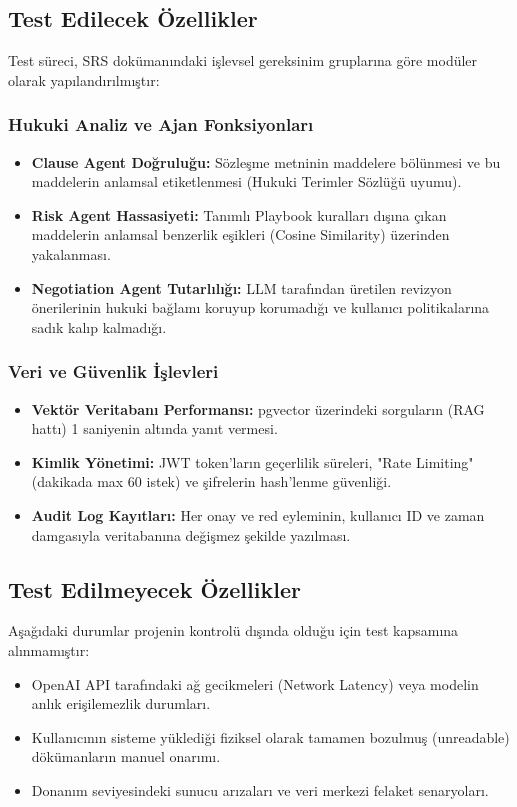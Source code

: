 \documentclass[12pt,a4paper]{article}
\begin{document}
\subsection{Test Edilecek Özellikler}
Test süreci, SRS dokümanındaki işlevsel gereksinim gruplarına göre modüler olarak yapılandırılmıştır:

\subsubsection{Hukuki Analiz ve Ajan Fonksiyonları}
\begin{itemize}
    \item \textbf{Clause Agent Doğruluğu:} Sözleşme metninin maddelere bölünmesi ve bu maddelerin anlamsal etiketlenmesi (Hukuki Terimler Sözlüğü uyumu).
    \item \textbf{Risk Agent Hassasiyeti:} Tanımlı Playbook kuralları dışına çıkan maddelerin anlamsal benzerlik eşikleri (Cosine Similarity) üzerinden yakalanması.
    \item \textbf{Negotiation Agent Tutarlılığı:} LLM tarafından üretilen revizyon önerilerinin hukuki bağlamı koruyup korumadığı ve kullanıcı politikalarına sadık kalıp kalmadığı.
\end{itemize}

\subsubsection{Veri ve Güvenlik İşlevleri}
\begin{itemize}
    \item \textbf{Vektör Veritabanı Performansı:} pgvector üzerindeki sorguların (RAG hattı) 1 saniyenin altında yanıt vermesi.
    \item \textbf{Kimlik Yönetimi:} JWT token'ların geçerlilik süreleri, "Rate Limiting" (dakikada max 60 istek) ve şifrelerin hash'lenme güvenliği.
    \item \textbf{Audit Log Kayıtları:} Her onay ve red eyleminin, kullanıcı ID ve zaman damgasıyla veritabanına değişmez şekilde yazılması.
\end{itemize}

\subsection{Test Edilmeyecek Özellikler}
Aşağıdaki durumlar projenin kontrolü dışında olduğu için test kapsamına alınmamıştır:
\begin{itemize}
    \item OpenAI API tarafındaki ağ gecikmeleri (Network Latency) veya modelin anlık erişilemezlik durumları.
    \item Kullanıcının sisteme yüklediği fiziksel olarak tamamen bozulmuş (unreadable) dökümanların manuel onarımı.
    \item Donanım seviyesindeki sunucu arızaları ve veri merkezi felaket senaryoları.
\end{itemize}
\end{document}
